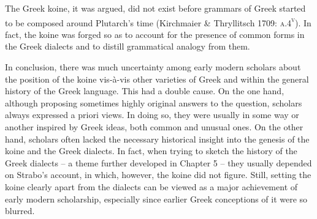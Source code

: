 \begin{styleStandard}
The Greek koine, it was argued, did not exist before grammars of Greek started to be composed around Plutarch’s time (Kirchmaier \& Thryllitsch 1709: \textsc{a.4}\textsc{\textsuperscript{v}}). In fact, the koine was forged so as to account for the presence of common forms in the Greek dialects and to distill grammatical analogy from them.
\end{styleStandard}

\begin{styleStandard}
In conclusion, there was much uncertainty among early modern scholars about the position of the koine vis-à-vis other varieties of Greek and within the general history of the Greek language. This had a double cause. On the one hand, although proposing sometimes highly original answers to the question, scholars always expressed a priori views. In doing so, they were usually in some way or another inspired by Greek ideas, both common and unusual ones. On the other hand, scholars often lacked the necessary historical insight into the genesis of the koine and the Greek dialects. In fact, when trying to sketch the history of the Greek dialects – a theme further developed in Chapter 5 – they usually depended on Strabo’s account, in which, however, the koine did not figure. Still, setting the koine clearly apart from the dialects can be viewed as a major achievement of early modern scholarship, especially since earlier Greek conceptions of it were so blurred.
\end{styleStandard}

